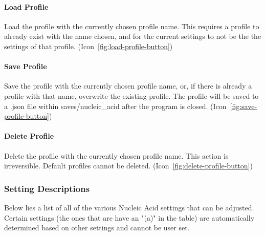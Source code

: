 \documentclass[titlepage]{article}
\begin{document}
	\paragraph{Load Profile}
	Load the profile with the currently chosen profile name. This requires a profile to already exist with the name chosen, and for the current settings to not be the  the settings of that profile. (Icon~\ref{fig:load-profile-button})
	
	\paragraph{Save Profile}
	Save the profile with the currently chosen profile name, or, if there is already a profile with that name, overwrite the existing profile. The profile will be saved to a .json file within saves/nucleic\_acid after the program is closed. (Icon~\ref{fig:save-profile-button})
	
	\paragraph{Delete Profile}
	Delete the profile with the currently chosen profile name. This action is irreversible. Default profiles cannot be deleted. (Icon~\ref{fig:delete-profile-button})

	\subsubsection{Setting Descriptions}
	Below lies a list of all of the various Nucleic Acid settings that can be adjusted. Certain settings (the ones that are have an "(a)" in the table) are automatically determined based on other settings and cannot be user set. \linebreak
	
\end{document}
